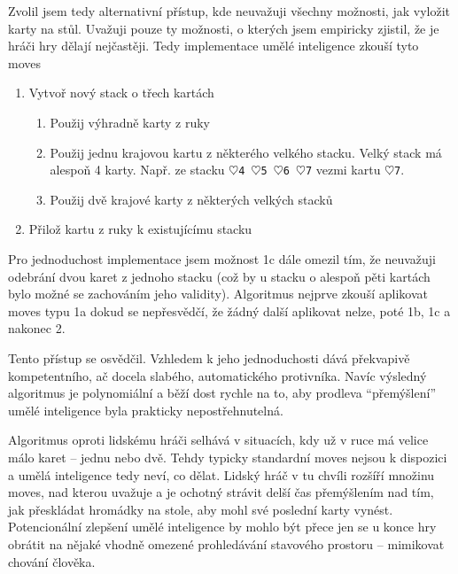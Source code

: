 \documentclass{article}
\begin{document}
Zvolil jsem tedy alternativní přístup, kde neuvažuji všechny možnosti, jak
vyložit karty na stůl. Uvažuji pouze ty možnosti, o kterých jsem empiricky
zjistil, že je hráči hry dělají nejčastěji. Tedy implementace umělé inteligence
zkouší tyto moves
\begin{enumerate}
	\item Vytvoř nový stack o třech kartách
		\begin{enumerate}
			\item Použij výhradně karty z ruky
			\item Použij jednu krajovou kartu z některého velkého
				stacku. Velký stack má alespoň 4 karty. Např.
				ze stacku \texttt{$\heartsuit$4 $\heartsuit$5
				$\heartsuit$6 $\heartsuit$7} vezmi kartu
				\texttt{$\heartsuit$7}.
			\item Použij dvě krajové karty z některých velkých
				stacků
		\end{enumerate}
	\item Přilož kartu z ruky k existujícímu stacku
\end{enumerate}
Pro jednoduchost implementace jsem možnost 1c dále omezil tím, že neuvažuji
odebrání dvou karet z jednoho stacku (což by u stacku o alespoň pěti kartách
bylo možné se zachováním jeho validity). Algoritmus nejprve zkouší aplikovat
moves typu 1a dokud se nepřesvědčí, že žádný další aplikovat nelze, poté 1b, 1c
a nakonec 2.

Tento přístup se osvědčil. Vzhledem k jeho jednoduchosti dává překvapivě
kompetentního, ač docela slabého, automatického protivníka. Navíc výsledný
algoritmus je polynomiální a běží dost rychle na to, aby prodleva
\enquote{přemýšlení} umělé inteligence byla prakticky nepostřehnutelná.

Algoritmus oproti lidskému hráči selhává v situacích, kdy už v ruce má velice
málo karet -- jednu nebo dvě. Tehdy typicky standardní moves nejsou k dispozici
a umělá inteligence tedy neví, co dělat. Lidský hráč v tu chvíli rozšíří
množinu moves, nad kterou uvažuje a je ochotný strávit delší čas přemýšlením
nad tím, jak přeskládat hromádky na stole, aby mohl své poslední karty vynést.
Potencionální zlepšení umělé inteligence by mohlo být přece jen se u konce hry
obrátit na nějaké vhodně omezené prohledávání stavového prostoru -- mimikovat
chování člověka.
\end{document}
